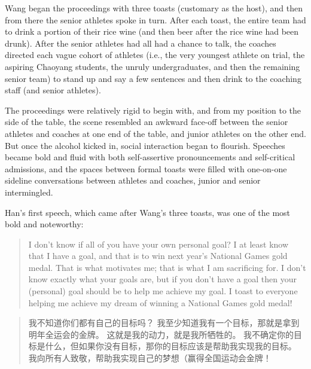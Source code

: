   Wang began the proceedings with three toasts (customary as the host), and then from there the senior athletes spoke in turn.  After each toast, the entire team had to drink a portion of their rice wine (and then beer after the rice wine had been drunk).  After the senior athletes had all had a chance to talk, the coaches directed each vague cohort of athletes (i.e., the very youngest athlete on trial, the aspiring Chaoyang students, the unruly undergraduates, and then the remaining senior team) to stand up and say a few sentences and then drink to the coaching staff (and senior athletes).

  The proceedings were relatively rigid to begin with, and from my position to the side of the table, the scene resembled an awkward face-off between the senior athletes and coaches at one end of the table, and junior athletes on the other end.  But once the alcohol kicked in, social interaction began to flourish. Speeches became bold and fluid with both self-assertive pronouncements and self-critical admissions, and the spaces between formal toasts were filled with one-on-one sideline conversations between athletes and coaches, junior and senior intermingled.

  Han's first speech, which came after Wang's three toasts, was one of the most bold and noteworthy:

  \begin{quotation}
    I don’t know if all of you have your own personal goal?  I at least know that I have a goal, and that is to win next year’s National Games gold medal.  That is what motivates me; that is what I am sacrificing for.  I don’t know exactly what your goals are, but if you don't have a goal then your (personal) goal should be to help me achieve my goal.  I toast to everyone helping me achieve my dream of winning a National Games gold medal!
  \end{quotation}

  \begin{CJK}{UTF8}{gbsn}
    \begin{quotation}
        我不知道你们都有自己的目标吗？ 我至少知道我有一个目标，那就是拿到明年全运会的金牌。 这就是我的动力，就是我所牺牲的。 我不确定你的目标是什么，但如果你没有目标，那你的目标应该是帮助我实现我的目标。 我向所有人致敬，帮助我实现自己的梦想（赢得全国运动会金牌！
    \end{quotation}
  \end{CJK}

